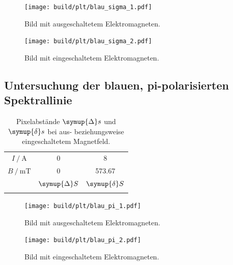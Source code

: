 \begin{figure}
    \centering
    \texttt{[image: build/plt/blau\_sigma\_1.pdf]}
    \caption{Bild mit ausgeschaltetem Elektromagneten.}
    \label{fig:plt:blau_sigma_1}
\end{figure}

\begin{figure}
    \centering
    \texttt{[image: build/plt/blau\_sigma\_2.pdf]}
    \caption{Bild mit eingeschaltetem Elektromagneten.}
    \label{fig:plt:blau_sigma_2}
\end{figure}


\FloatBarrier
\subsection{Untersuchung der blauen, pi-polarisierten Spektrallinie}

\begin{table}
    \centering
    \caption{Pixelabstände $\symup{\Delta} s$ und $\symup{\delta} s$ bei aus- beziehungsweise eingeschaltetem Magnetfeld.}
    \label{tab:blau_pi}
    \begin{tabular}{S S S}
        \toprule
        {$I \mathbin{/} \si{\ampere}$} & 0 & 8 \\
        {$B \mathbin{/} \si{\milli\tesla}$} & 0 & 573.67  \\
        \midrule
        & {$\symup{\Delta} S$} & {$\symup{\delta} S$} \\
        \midrule
        \bottomrule
    \end{tabular}
\end{table}

\begin{figure}
    \centering
    \texttt{[image: build/plt/blau\_pi\_1.pdf]}
    \caption{Bild mit ausgeschaltetem Elektromagneten.}
    \label{fig:plt:blau_pi_1}
\end{figure}

\begin{figure}
    \centering
    \texttt{[image: build/plt/blau\_pi\_2.pdf]}
    \caption{Bild mit eingeschaltetem Elektromagneten.}
    \label{fig:plt:blau_pi_2}
\end{figure}
